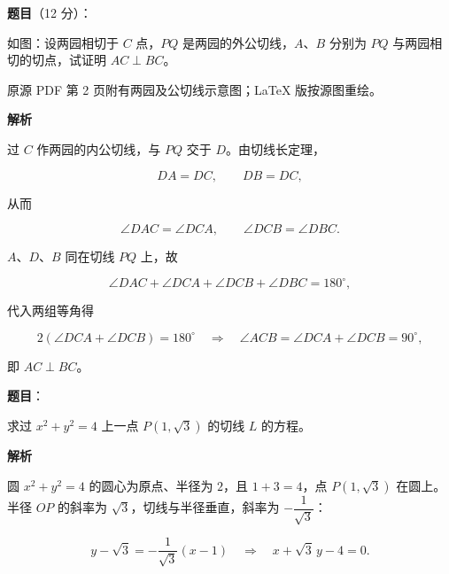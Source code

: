 \begin{answer}

\textbf{题目}（12 分）：

如图：设两园相切于 $C$ 点，$PQ$ 是两园的外公切线，$A$、$B$ 分别为 $PQ$ 与两园相切的切点，试证明 $AC\perp BC$。

\begin{gktip}
原源 PDF 第 2 页附有两园及公切线示意图；LaTeX 版按源图重绘。
\end{gktip}
\nopagebreak[4]
\begin{center}\end{center}
\nopagebreak[4]
\textbf{解析}
\nopagebreak[4]
\begin{center}\end{center}
\nopagebreak[4]
过 $C$ 作两园的内公切线，与 $PQ$ 交于 $D$。由切线长定理，

\nopagebreak[4]
\[
DA=DC,\qquad DB=DC,
\]

从而

\nopagebreak[4]
\[
\angle DAC=\angle DCA,\qquad
\angle DCB=\angle DBC.
\]

$A$、$D$、$B$ 同在切线 $PQ$ 上，故

\nopagebreak[4]
\[
\angle DAC+\angle DCA+\angle DCB+\angle DBC=180^\circ,
\]

代入两组等角得

\nopagebreak[4]
\[
2(\angle DCA+\angle DCB)=180^\circ
\quad\Longrightarrow\quad
\angle ACB=\angle DCA+\angle DCB=90^\circ,
\]

即 $AC\perp BC$。


\end{answer}
\begin{answer}

\textbf{题目}：

求过 $x^2+y^2=4$ 上一点 $P(1,\sqrt3)$ 的切线 $L$ 的方程。

\textbf{解析}

圆 $x^2+y^2=4$ 的圆心为原点、半径为 $2$，且 $1+3=4$，点 $P(1,\sqrt3)$ 在圆上。半径 $OP$ 的斜率为 $\sqrt3$，切线与半径垂直，斜率为 $-\dfrac1{\sqrt3}$：

\nopagebreak[4]
\[
y-\sqrt3=-\frac1{\sqrt3}(x-1)
\quad\Longrightarrow\quad
x+\sqrt3\,y-4=0.
\]


\end{answer}

